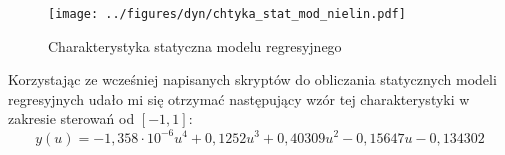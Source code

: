 \documentclass[a4paper,titlepage,11pt,floatssmall]{mwrep}
\begin{document}
\begin{figure}[H]
\centering
\texttt{[image: ../figures/dyn/chtyka\_stat\_mod\_nielin.pdf]}
\caption{Charakterystyka statyczna modelu regresyjnego}
\end{figure}

Korzystając ze wcześniej napisanych skryptów do obliczania statycznych modeli regresyjnych udało mi się otrzymać następujący wzór tej charakterystyki w zakresie sterowań od $[-1, 1]$:
\begin{equation*}
y(u) = -1,358 \cdot 10^{-6}u^4 + 0,1252u^3 + 0,40309u^2 - 0,15647u -0,134302
\end{equation*}
\end{document}

